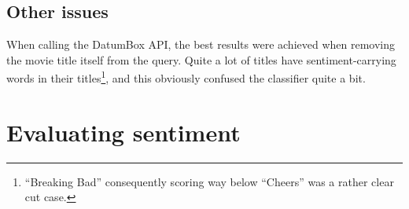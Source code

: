 \subsection{Other issues}

When calling the DatumBox API, the best results were achieved when removing the movie title itself from the query. Quite a lot of titles have sentiment-carrying words in their titles\footnote{``Breaking Bad'' consequently scoring way below ``Cheers'' was a rather clear cut case.}, and this obviously confused the classifier quite a bit.


\section{Evaluating sentiment} %
\label{sec:evaluating_sentiment}



